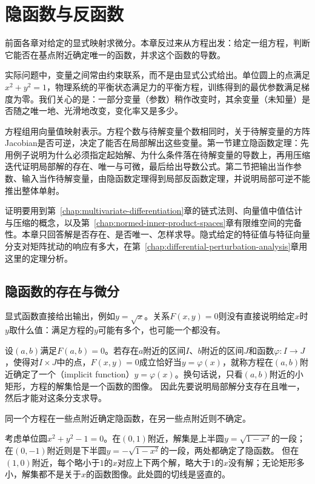 \chapter{隐函数与反函数}
\label{sec:analysis-implicit-parameter-integral}
\label{chap:implicit-inverse-functions}

前面各章对给定的显式映射求微分。本章反过来从方程出发：给定一组方程，判断它能否在基点附近确定唯一的函数，并求这个函数的导数。

实际问题中，变量之间常由约束联系，而不是由显式公式给出。单位圆上的点满足$x^2+y^2=1$，物理系统的平衡状态满足力的平衡方程，训练得到的最优参数满足梯度为零。我们关心的是：一部分变量（参数）稍作改变时，其余变量（未知量）是否随之唯一地、光滑地改变，变化率又是多少。

方程组用向量值映射表示。方程个数与待解变量个数相同时，关于待解变量的方阵Jacobian是否可逆，决定了能否在局部解出这些变量。第一节建立隐函数定理：先用例子说明为什么必须指定起始解、为什么条件落在待解变量的导数上，再用压缩迭代证明局部解的存在、唯一与可微，最后给出导数公式。第二节把输出当作参数、输入当作待解变量，由隐函数定理得到局部反函数定理，并说明局部可逆不能推出整体单射。

证明要用到第~\ref{chap:multivariate-differentiation}章的链式法则、向量值中值估计与压缩的概念，以及第~\ref{chap:normed-inner-product-spaces}章有限维空间的完备性。本章只回答解是否存在、是否唯一、怎样求导。隐式给定的特征值与特征向量分支对矩阵扰动的响应有多大，在第~\ref{chap:differential-perturbation-analysis}章用这里的定理分析。

\section{隐函数的存在与微分}
\label{sec:multivariable-implicit-function}

显式函数直接给出输出，例如$y=\sqrt x$。关系$F(x,y)=0$则没有直接说明给定$x$时$y$取什么值：满足方程的$y$可能有多个，也可能一个都没有。

设$(a,b)$满足$F(a,b)=0$。若存在$a$附近的区间$I$、$b$附近的区间$J$和函数$\varphi:I\to J$，使得对$I\times J$中的点，$F(x,y)=0$成立恰好当$y=\varphi(x)$，就称方程在$(a,b)$附近确定了一个（implicit function）$y=\varphi(x)$。换句话说，只看$(a,b)$附近的小矩形，方程的解集恰是一个函数的图像。
因此先要说明局部解分支存在且唯一，然后才能对这条分支求导。

同一个方程在一些点附近确定隐函数，在另一些点附近则不确定。
\begin{example}[单位圆附近的隐函数]
\label{ex:multivariable-implicit-circle}
考虑单位圆$x^2+y^2-1=0$。在$(0,1)$附近，解集是上半圆$y=\sqrt{1-x^2}$的一段；在$(0,-1)$附近则是下半圆$y=-\sqrt{1-x^2}$的一段，两处都确定了隐函数。
但在$(1,0)$附近，每个略小于$1$的$x$对应上下两个解，略大于$1$的$x$没有解；无论矩形多小，解集都不是关于$x$的函数图像。此处圆的切线是竖直的。
\end{example}

